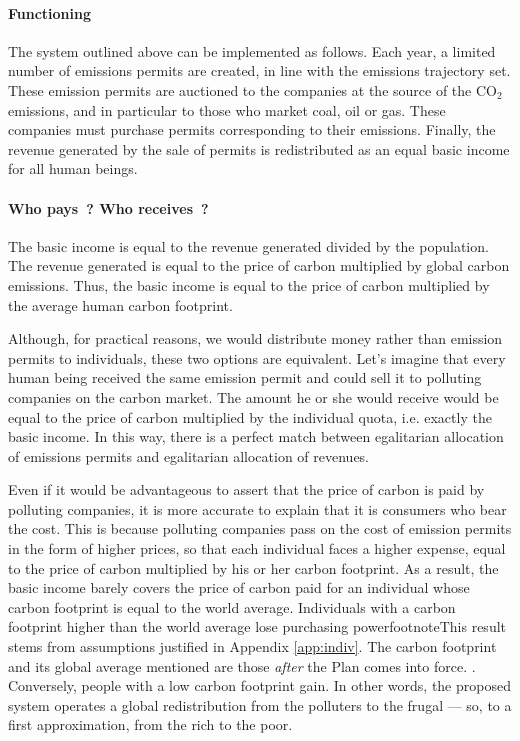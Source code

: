 \documentclass[a5paper,french,openany]{memoir}
\begin{document}
\paragraph{Functioning}
The system outlined above can be implemented as follows. Each year, a limited number of emissions permits are created, in line with the emissions trajectory set. These emission permits are auctioned to the companies at the source of the CO$_\text{2}$ emissions, and in particular to those who market %
coal, oil or gas. These companies must purchase permits corresponding to their emissions. Finally, the revenue generated by the sale of permits is redistributed as an equal basic income for all human beings. 

\paragraph{Who pays~? Who receives~?}
The basic income is equal to the revenue generated divided by the population. The revenue generated is equal to the price of carbon multiplied by global carbon emissions. Thus, the basic income is equal to the price of carbon multiplied by the average human carbon footprint. 

Although, for practical reasons, we would distribute money rather than emission permits to individuals, these two options are equivalent. Let's imagine that every human being received the same emission permit and could sell it to polluting companies on the carbon market. The amount he or she would receive would be equal to the price of carbon multiplied by the individual quota, i.e. exactly the basic income. In this way, there is a perfect match between egalitarian allocation of emissions permits and egalitarian allocation of revenues. %

Even if it would be advantageous %
to assert that the price of carbon is paid by polluting companies, it is more accurate to explain that it is consumers who bear the cost. 
This is because polluting companies pass on the cost of emission permits in the form of higher prices, so that each individual faces a higher expense, equal to the price of carbon multiplied by his or her carbon footprint. As a result, the basic income barely covers the price of carbon paid for an individual whose carbon footprint is equal to the world average. Individuals with a carbon footprint higher than the world average lose purchasing powerfootnote{This result stems from assumptions justified in Appendix \ref{app:indiv}. The carbon footprint and its global average mentioned are those \textit{after} the Plan comes into force.
}. Conversely, people with a low carbon footprint gain. In other words, the proposed system operates a global redistribution from the polluters to the frugal --- so, to a first approximation, from the rich to the poor. 
\end{document}
